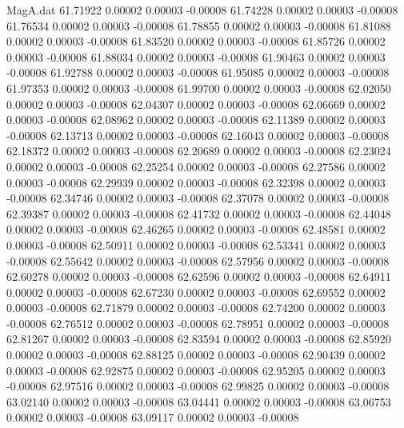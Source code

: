 \begin{filecontents}{MagA.dat}
  61.71922    0.00002    0.00003   -0.00008
  61.74228    0.00002    0.00003   -0.00008
  61.76534    0.00002    0.00003   -0.00008
  61.78855    0.00002    0.00003   -0.00008
  61.81088    0.00002    0.00003   -0.00008
  61.83520    0.00002    0.00003   -0.00008
  61.85726    0.00002    0.00003   -0.00008
  61.88034    0.00002    0.00003   -0.00008
  61.90463    0.00002    0.00003   -0.00008
  61.92788    0.00002    0.00003   -0.00008
  61.95085    0.00002    0.00003   -0.00008
  61.97353    0.00002    0.00003   -0.00008
  61.99700    0.00002    0.00003   -0.00008
  62.02050    0.00002    0.00003   -0.00008
  62.04307    0.00002    0.00003   -0.00008
  62.06669    0.00002    0.00003   -0.00008
  62.08962    0.00002    0.00003   -0.00008
  62.11389    0.00002    0.00003   -0.00008
  62.13713    0.00002    0.00003   -0.00008
  62.16043    0.00002    0.00003   -0.00008
  62.18372    0.00002    0.00003   -0.00008
  62.20689    0.00002    0.00003   -0.00008
  62.23024    0.00002    0.00003   -0.00008
  62.25254    0.00002    0.00003   -0.00008
  62.27586    0.00002    0.00003   -0.00008
  62.29939    0.00002    0.00003   -0.00008
  62.32398    0.00002    0.00003   -0.00008
  62.34746    0.00002    0.00003   -0.00008
  62.37078    0.00002    0.00003   -0.00008
  62.39387    0.00002    0.00003   -0.00008
  62.41732    0.00002    0.00003   -0.00008
  62.44048    0.00002    0.00003   -0.00008
  62.46265    0.00002    0.00003   -0.00008
  62.48581    0.00002    0.00003   -0.00008
  62.50911    0.00002    0.00003   -0.00008
  62.53341    0.00002    0.00003   -0.00008
  62.55642    0.00002    0.00003   -0.00008
  62.57956    0.00002    0.00003   -0.00008
  62.60278    0.00002    0.00003   -0.00008
  62.62596    0.00002    0.00003   -0.00008
  62.64911    0.00002    0.00003   -0.00008
  62.67230    0.00002    0.00003   -0.00008
  62.69552    0.00002    0.00003   -0.00008
  62.71879    0.00002    0.00003   -0.00008
  62.74200    0.00002    0.00003   -0.00008
  62.76512    0.00002    0.00003   -0.00008
  62.78951    0.00002    0.00003   -0.00008
  62.81267    0.00002    0.00003   -0.00008
  62.83594    0.00002    0.00003   -0.00008
  62.85920    0.00002    0.00003   -0.00008
  62.88125    0.00002    0.00003   -0.00008
  62.90439    0.00002    0.00003   -0.00008
  62.92875    0.00002    0.00003   -0.00008
  62.95205    0.00002    0.00003   -0.00008
  62.97516    0.00002    0.00003   -0.00008
  62.99825    0.00002    0.00003   -0.00008
  63.02140    0.00002    0.00003   -0.00008
  63.04441    0.00002    0.00003   -0.00008
  63.06753    0.00002    0.00003   -0.00008
  63.09117    0.00002    0.00003   -0.00008

\end{filecontents}
